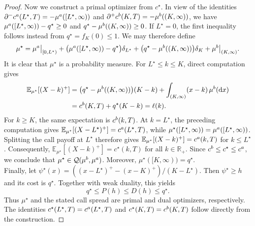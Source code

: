 \documentclass[10pt,a4paper]{amsart}
\newcommand{\E}{\mathbb{E}}
\newcommand{\R}{\mathbb{R}} %
\newcommand{\cQ}{\mathcal{Q}}
\newcommand*{\rd}{\mathrm{d}}
\begin{document}
\begin{proof}
Now we construct a primal optimizer from $c^\star$. In view of the identities
$\partial^-c^{\rm a}(L^\star,T)
=-\mu^{\rm a}([L^\star,\infty))$ and
$\partial^+c^{\rm b}(K,T)
=-\mu^{\rm b}((K,\infty))$, we have $\mu^{\rm a}([L^\star,\infty))-q^\star\ge0$ and
$q^\star-\mu^{\rm b}((K,\infty))\ge0$. If $L^\star=0$, the first
inequality follows instead from $q^\star = f_K(0)\le1$. We may
therefore define
\[
\mu^\star
=
\mu^{\rm a}\big|_{[0,L^\star)}
+\big(\mu^{\rm a}([L^\star,\infty))-q^\star\big)\delta_{L^\star}
+\big(q^\star-\mu^{\rm b}((K,\infty))\big)\delta_K
+\mu^{\rm b}\big|_{(K,\infty)}.
\]
It is clear that $\mu^\star$ is a probability
measure. For $L^\star\le k\le K$, direct computation gives
\[
\begin{aligned}
\E_{\mu^\star}[(X-k)^+]
&=\big(q^\star-\mu^{\rm b}((K,\infty))\big)(K-k)
  +\int_{(K,\infty)}(x-k)\,\mu^{\rm b}(\rd x)\\
&=c^{\rm b}(K,T)+q^\star(K-k)=\ell(k).
\end{aligned}
\]
For $k\ge K$, the same expectation is $c^{\rm b}(k,T)$. At
$k=L^\star$, the preceding computation gives
$\E_{\mu^\star}[(X-L^\star)^+]=c^{\rm a}(L^\star,T)$, while
$\mu^\star([L^\star,\infty))
=\mu^{\rm a}([L^\star,\infty))$. Splitting the call payoff at
$L^\star$ therefore gives
$\E_{\mu^\star}[(X-k)^+]=c^{\rm a}(k,T)$ for $k\le L^\star$.
Consequently,
$\E_{\mu^\star}[(X-k)^+]=c^\star(k,T)$ for all $k\in\R_+$.
Since $c^{\rm b}\le c^\star\le c^{\rm a}$, we conclude that
$\mu^\star\in\cQ(\mu^{\rm b},\mu^{\rm a})$. Moreover,
$\mu^\star([K,\infty))=q^\star$.
\\
Finally, let
$\psi^\star(x)=((x-L^\star)^+-(x-K)^+)/(K-L^\star)$. Then
$\psi^\star\ge h$ and its cost is $q^\star$. Together with weak
duality, this yields
\[
q^\star\le P(h)\le D(h)\le q^\star.
\]
Thus $\mu^\star$ and the stated call spread are primal and dual
optimizers, respectively. The identities
$c^\star(L^\star,T)=c^{\rm a}(L^\star,T)$ and
$c^\star(K,T)=c^{\rm b}(K,T)$ follow directly from the construction.
\end{proof}
\end{document}
